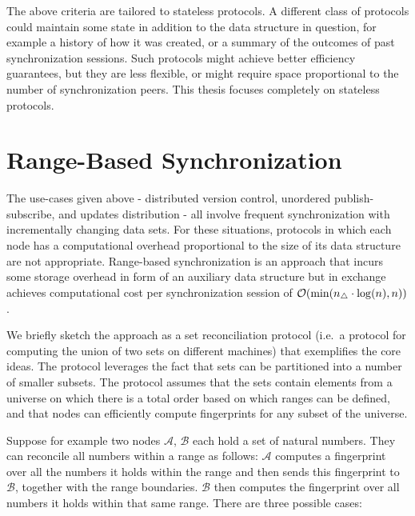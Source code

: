 The above criteria are tailored to stateless protocols. A different class of protocols could maintain some state in addition to the data structure in question, for example a history of how it was created, or a summary of the outcomes of past synchronization sessions. Such protocols might achieve better efficiency guarantees, but they are less flexible, or might require space proportional to the number of synchronization peers. This thesis focuses completely on stateless protocols.

\section{Range-Based Synchronization}
\label{recursively-comparing-fingerprints}

The use-cases given above - distributed version control, unordered publish-subscribe, and updates distribution - all involve frequent synchronization with incrementally changing data sets. For these situations, protocols in which each node has a computational overhead proportional to the size of its data structure are not appropriate. Range-based synchronization is an approach that incurs some storage overhead in form of an auxiliary data structure but in exchange achieves computational cost per synchronization session  of $\mathcal{O}(\min(n_{\triangle} \cdot \log(n), n))$.

We briefly sketch the approach as a set reconciliation
protocol (i.e.~a protocol for computing the union of two sets on
different machines) that exemplifies the core ideas. The protocol
leverages the fact that sets can be partitioned into a number of smaller
subsets. The protocol assumes that the sets contain elements from
a universe on which there is a total order based on which ranges can be
defined, and that nodes can efficiently compute fingerprints for any subset of the
universe.

Suppose for example two nodes $\mathcal{A}$, $\mathcal{B}$ each hold a set of natural numbers.
They can reconcile all numbers within a range as follows: $\mathcal{A}$ computes
a fingerprint over all the numbers it holds within the range and then sends this
fingerprint to $\mathcal{B}$, together with the range boundaries. $\mathcal{B}$ then computes
the fingerprint over all numbers it holds within that same range. There
are three possible cases:


